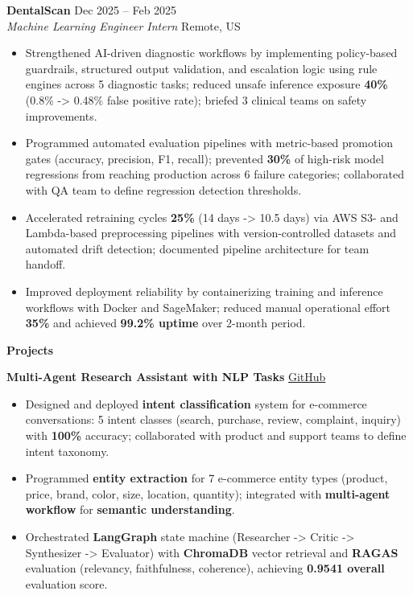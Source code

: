 \documentclass[10pt, letterpaper]{article}
\newcommand{\mysection}[1]{%
  \vspace{10pt}%
  {\noindent\large\bfseries #1}%
  \vspace{4pt}{\hrule}%
  \vspace{6pt}%
}
\newcommand{\resumeItem}[1]{\item\small{#1}}
\begin{document}
\noindent\textbf{DentalScan} \hfill Dec 2025 -- Feb 2025 \\
\textit{Machine Learning Engineer Intern} \hfill Remote, US
\begin{itemize}
  \resumeItem{Strengthened AI-driven diagnostic workflows by implementing policy-based guardrails, structured output validation, and escalation logic using rule engines across 5 diagnostic tasks; reduced unsafe inference exposure \textbf{40\%} (0.8\% -> 0.48\% false positive rate); briefed 3 clinical teams on safety improvements.}
  \resumeItem{Programmed automated evaluation pipelines with metric-based promotion gates (accuracy, precision, F1, recall); prevented \textbf{30\%} of high-risk model regressions from reaching production across 6 failure categories; collaborated with QA team to define regression detection thresholds.}
  \resumeItem{Accelerated retraining cycles \textbf{25\%} (14 days -> 10.5 days) via AWS S3- and Lambda-based preprocessing pipelines with version-controlled datasets and automated drift detection; documented pipeline architecture for team handoff.}
  \resumeItem{Improved deployment reliability by containerizing training and inference workflows with Docker and SageMaker; reduced manual operational effort \textbf{35\%} and achieved \textbf{99.2\% uptime} over 2-month period.}
\end{itemize}

\vspace{-3mm}
\mysection{Projects}

\noindent\textbf{Multi-Agent Research Assistant with NLP Tasks} \hfill \href{https://github.com/saitejasrivilli/multi-agent-research-mcp}{GitHub}
\begin{itemize}
  \resumeItem{Designed and deployed \textbf{intent classification} system for e-commerce conversations: 5 intent classes (search, purchase, review, complaint, inquiry) with \textbf{100\%} accuracy; collaborated with product and support teams to define intent taxonomy.}
  \resumeItem{Programmed \textbf{entity extraction} for 7 e-commerce entity types (product, price, brand, color, size, location, quantity); integrated with \textbf{multi-agent workflow} for \textbf{semantic understanding}.}
  \resumeItem{Orchestrated \textbf{LangGraph} state machine (Researcher -> Critic -> Synthesizer -> Evaluator) with \textbf{ChromaDB} vector retrieval and \textbf{RAGAS} evaluation (relevancy, faithfulness, coherence), achieving \textbf{0.9541 overall} evaluation score.}
\end{itemize}
\end{document}
